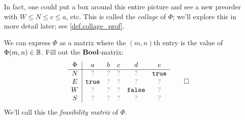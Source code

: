\documentclass[7Sketches]{subfiles}
\begin{document}
\begin{example}
In fact, one could put a box around this entire picture and see a new preorder with
$W\leq N\leq c\leq a$, etc. This is called the \emph{collage} of $\Phi$; we'll
explore this in more detail later; see \cref{def.collage_prof}.%
\end{example}

\begin{exercise} %
\label{exc.feas_matrix}
We can express $\Phi$ as a matrix where the $(m,n)$th entry is the value of
$\Phi(m,n)\in \mathbb{B}$. Fill out the $\mathbf{Bool}$-matrix:
\[
\begin{array}{c|ccccc}
	\Phi&a&b&c&d&e\\\hline
  N&\?&\?&\?&\?&\true\\
  E&\true&\?&\?&\?&\?\\
  W&\?&\?&\?&\false&\?\\
  S&\?&\?&\?&\?&\?
\end{array}
\qedhere
\]
We'll call this the \emph{feasibility matrix} of
$\Phi$.%
\end{exercise}
\end{document}
